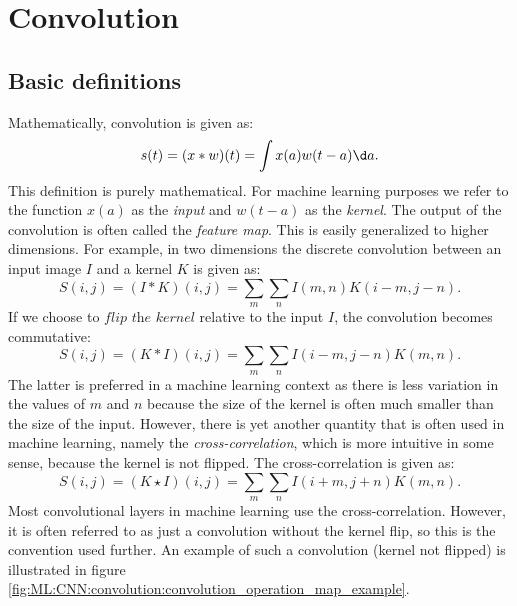 %
%

\section{Convolution}
    \subsection{Basic definitions}
        Mathematically, convolution is given as:
        \begin{equation}\label{eq:ML:CNN:convolution:basic_defintion}
            s(t) = (x * w)(t) = \int x(a)w(t-a)\d a.
        \end{equation}
        This definition is purely mathematical. For machine learning purposes we refer to the function $x(a)$ as the \textit{input} and $w(t-a)$ as the \textit{kernel}. The output of the convolution is often called the \textit{feature map}. This is easily generalized to higher dimensions. For example, in two dimensions the discrete convolution between an input image $I$ and a kernel $K$ is given as:
        \begin{equation}\label{eq:ML:CNN:convolution:discrete_convolution}
            S(i,j) = (I * K)(i,j) = \sum_m\sum_n I(m,n)K(i-m,j-n).
        \end{equation}
        If we choose to $\textit{flip the kernel}$ relative to the input $I$, the convolution becomes commutative:
        \begin{equation}\label{eq:ML:CNN:convolution:discrete_convolution_commutative}
            S(i,j) = (K * I)(i,j) = \sum_m\sum_n I(i-m,j-n)K(m,n).
        \end{equation}
        The latter is preferred in a machine learning context as there is less variation in the values of $m$ and $n$ because the size of the kernel is often much smaller than the size of the input. However, there is yet another quantity that is often used in machine learning, namely the \textit{cross-correlation}, which is more intuitive in some sense, because the kernel is not flipped. The cross-correlation is given as:
        \begin{equation}\label{eq:ML:CNN:convolution:cross_correlation}
            S(i,j) = (K \star I)(i,j) = \sum_m\sum_n I(i+m,j+n)K(m,n).
        \end{equation}
        Most convolutional layers in machine learning use the cross-correlation. However, it is often referred to as just a convolution without the kernel flip, so this is the convention used further. An example of such a convolution (kernel not flipped) is illustrated in figure \ref{fig:ML:CNN:convolution:convolution_operation_map_example}.


